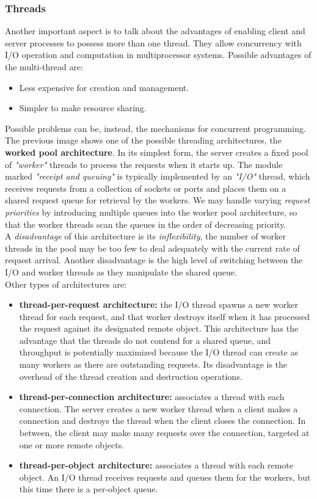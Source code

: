 \subsubsection{Threads}
Another important aspect is to talk about the advantages of enabling client and server processes to possess more than one thread. They allow concurrency with I/O operation and computation in multiprocessor systems. Possible advantages of the multi-thread are:
\begin{itemize}
	\item Less expensive for creation and management.
	\item Simpler to make resource sharing.
\end{itemize} 
Possible problems can be, instead, the mechanisms for concurrent programming.
The previous image shows one of the possible threading architectures, the \textbf{worked pool architecture}. In its simplest form, the server creates a fixed pool of \textit{"worker"} threads to process the requests when it starts up. The module marked \textit{"receipt and queuing"} is typically implemented by an \textit{"I/O"} thread, which receives requests from a collection of sockets or ports and places them on a shared request queue for retrieval by the workers. We may handle varying \textit{request priorities} by introducing multiple queues into the worker pool architecture, so that the worker threads scan the queues in the order of decreasing priority.\\
A \textit{disadvantage} of this architecture is its \textit{inflexibility}, the number of worker threads in the pool may be too few to deal adequately with the current rate of request arrival. Another disadvantage is the high level of switching between the I/O and worker threads as they manipulate the shared queue.\\
Other types of architectures are:
\begin{itemize}
	\item \textbf{thread-per-request architecture:} the I/O thread spawns a new worker thread for each request, and that worker destroys itself when it has processed the 	request against its designated remote object. This architecture has the advantage that the threads do not contend for a shared queue, and throughput is potentially maximized because the I/O thread can create as many workers as there are outstanding requests. Its disadvantage is the overhead of the thread creation and destruction operations.
	\item \textbf{thread-per-connection architecture:} associates a thread with
	each connection. The server creates a new worker thread when a client makes a
	connection and destroys the thread when the client closes the connection. In between,
	the client may make many requests over the connection, targeted at one or more remote objects.
	\item \textbf{thread-per-object architecture:} associates a thread with each
	remote object. An I/O thread receives requests and queues them for the workers, but this time there is a per-object queue.
\end{itemize}
